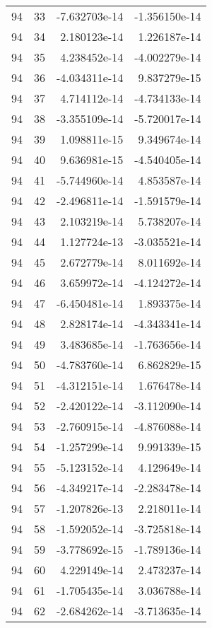 \begin{tabular}{rrrr}
  94 &   33 & -7.632703e-14 & -1.356150e-14 \\
  94 &   34 &  2.180123e-14 &  1.226187e-14 \\
  94 &   35 &  4.238452e-14 & -4.002279e-14 \\
  94 &   36 & -4.034311e-14 &  9.837279e-15 \\
  94 &   37 &  4.714112e-14 & -4.734133e-14 \\
  94 &   38 & -3.355109e-14 & -5.720017e-14 \\
  94 &   39 &  1.098811e-15 &  9.349674e-14 \\
  94 &   40 &  9.636981e-15 & -4.540405e-14 \\
  94 &   41 & -5.744960e-14 &  4.853587e-14 \\
  94 &   42 & -2.496811e-14 & -1.591579e-14 \\
  94 &   43 &  2.103219e-14 &  5.738207e-14 \\
  94 &   44 &  1.127724e-13 & -3.035521e-14 \\
  94 &   45 &  2.672779e-14 &  8.011692e-14 \\
  94 &   46 &  3.659972e-14 & -4.124272e-14 \\
  94 &   47 & -6.450481e-14 &  1.893375e-14 \\
  94 &   48 &  2.828174e-14 & -4.343341e-14 \\
  94 &   49 &  3.483685e-14 & -1.763656e-14 \\
  94 &   50 & -4.783760e-14 &  6.862829e-15 \\
  94 &   51 & -4.312151e-14 &  1.676478e-14 \\
  94 &   52 & -2.420122e-14 & -3.112090e-14 \\
  94 &   53 & -2.760915e-14 & -4.876088e-14 \\
  94 &   54 & -1.257299e-14 &  9.991339e-15 \\
  94 &   55 & -5.123152e-14 &  4.129649e-14 \\
  94 &   56 & -4.349217e-14 & -2.283478e-14 \\
  94 &   57 & -1.207826e-13 &  2.218011e-14 \\
  94 &   58 & -1.592052e-14 & -3.725818e-14 \\
  94 &   59 & -3.778692e-15 & -1.789136e-14 \\
  94 &   60 &  4.229149e-14 &  2.473237e-14 \\
  94 &   61 & -1.705435e-14 &  3.036788e-14 \\
  94 &   62 & -2.684262e-14 & -3.713635e-14 \\

\end{tabular}
